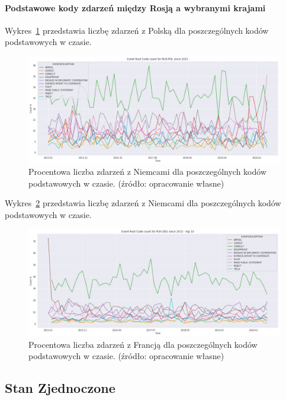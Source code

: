 \documentclass[11pt]{report}
\begin{document}
    \paragraph{Podstawowe kody zdarzeń między Rosją a wybranymi krajami}

    Wykres~\ref{fig:RUSPOLERC} przedstawia liczbę zdarzeń z Polską dla poszczególnych kodów podstawowych w czasie.
    \begin{figure}[!htp]
        \centering
        \includegraphics[width=\linewidth]{fig/RUS/RUSPOLERCperc.png}
        \caption{Procentowa liczba zdarzeń z Niemcami dla poszczególnych kodów podstawowych w czasie. (źródło: opracowanie własne)}
        \label{fig:RUSPOLERC}
    \end{figure}

    Wykres~\ref{fig:RUSRUSERC} przedstawia liczbę zdarzeń z Niemcami dla poszczególnych kodów podstawowych w czasie.
    \begin{figure}[!htp]
        \centering
        \includegraphics[width=\linewidth]{fig/RUS/RUSDEUERCperc.png}
        \caption{Procentowa liczba zdarzeń z Francją dla poszczególnych kodów podstawowych w czasie. (źródło: opracowanie własne)}
        \label{fig:RUSRUSERC}
    \end{figure}

    \subsection{Stan Zjednoczone}
\end{document}
